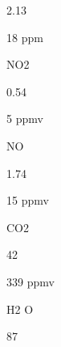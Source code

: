 \documentclass[a4paper,portrait,12pt]{article}
\begin{document}
2.13





\begin{flushleft}
18 ppm
\end{flushleft}





\begin{flushleft}
NO2
\end{flushleft}





0.54





\begin{flushleft}
5 ppmv
\end{flushleft}





\begin{flushleft}
NO
\end{flushleft}





1.74





\begin{flushleft}
15 ppmv
\end{flushleft}





\begin{flushleft}
CO2
\end{flushleft}





42





\begin{flushleft}
339 ppmv
\end{flushleft}





\begin{flushleft}
H2 O
\end{flushleft}





87
\end{document}
